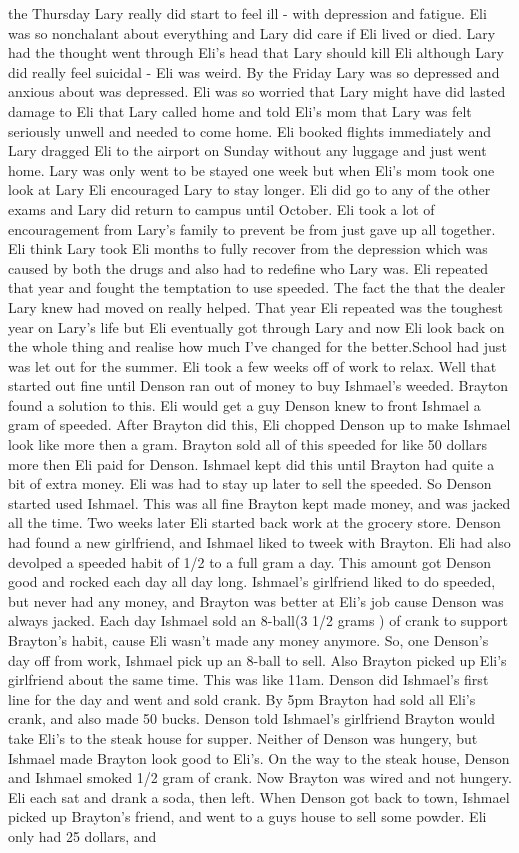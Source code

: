 \documentclass[12pt]{book}
\begin{document}
the Thursday Lary really did start to feel ill - with depression and fatigue. Eli was so nonchalant about everything and Lary did care if Eli lived or died. Lary had the thought went through Eli's head that Lary should kill Eli although Lary did really feel suicidal - Eli was weird. By the Friday Lary was so depressed and anxious about was depressed. Eli was so worried that Lary might have did lasted damage to Eli that Lary called home and told Eli's mom that Lary was felt seriously unwell and needed to come home. Eli booked flights immediately and Lary dragged Eli to the airport on Sunday without any luggage and just went home. Lary was only went to be stayed one week but when Eli's mom took one look at Lary Eli encouraged Lary to stay longer. Eli did go to any of the other exams and Lary did return to campus until October. Eli took a lot of encouragement from Lary's family to prevent be from just gave up all together. Eli think Lary took Eli months to fully recover from the depression which was caused by both the drugs and also had to redefine who Lary was. Eli repeated that year and fought the temptation to use speeded. The fact the that the dealer Lary knew had moved on really helped. That year Eli repeated was the toughest year on Lary's life but Eli eventually got through Lary and now Eli look back on the whole thing and realise how much I've changed for the better.School had just was let out for the summer. Eli took a few weeks off of work to relax. Well that started out fine until Denson ran out of money to buy Ishmael's weeded. Brayton found a solution to this. Eli would get a guy Denson knew to front Ishmael a gram of speeded. After Brayton did this, Eli chopped Denson up to make Ishmael look like more then a gram. Brayton sold all of this speeded for like 50 dollars more then Eli paid for Denson. Ishmael kept did this until Brayton had quite a bit of extra money. Eli was had to stay up later to sell the speeded. So Denson started used Ishmael. This was all fine Brayton kept made money, and was jacked all the time. Two weeks later Eli started back work at the grocery store. Denson had found a new girlfriend, and Ishmael liked to tweek with Brayton. Eli had also devolped a speeded habit of 1/2 to a full gram a day. This amount got Denson good and rocked each day all day long. Ishmael's girlfriend liked to do speeded, but never had any money, and Brayton was better at Eli's job cause Denson was always jacked. Each day Ishmael sold an 8-ball(3 1/2 grams ) of crank to support Brayton's habit, cause Eli wasn't made any money anymore. So, one Denson's day off from work, Ishmael pick up an 8-ball to sell. Also Brayton picked up Eli's girlfriend about the same time. This was like 11am. Denson did Ishmael's first line for the day and went and sold crank. By 5pm Brayton had sold all Eli's crank, and also made 50 bucks. Denson told Ishmael's girlfriend Brayton would take Eli's to the steak house for supper. Neither of Denson was hungery, but Ishmael made Brayton look good to Eli's. On the way to the steak house, Denson and Ishmael smoked 1/2 gram of crank. Now Brayton was wired and not hungery. Eli each sat and drank a soda, then left. When Denson got back to town, Ishmael picked up Brayton's friend, and went to a guys house to sell some powder. Eli only had 25 dollars, and 
\end{document}
